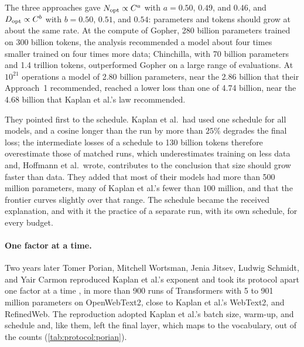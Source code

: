 \begin{refsection}
\begin{finding}\label{fd:protocol:hoffmann}
The three approaches gave $N_{\mathrm{opt}}\propto C^{a}$ with $a=0.50$, $0.49$, and $0.46$, and $D_{\mathrm{opt}}\propto C^{b}$ with $b=0.50$, $0.51$, and $0.54$: parameters and tokens should grow at about the same rate. At the compute of Gopher, 280 billion parameters trained on 300 billion tokens, the analysis recommended a model about four times smaller trained on four times more data; Chinchilla, with 70 billion parameters and 1.4 trillion tokens, outperformed Gopher on a large range of evaluations. At $10^{21}$ operations a model of 2.80 billion parameters, near the 2.86 billion that their Approach~1 recommended, reached a lower loss than one of 4.74 billion, near the 4.68 billion that Kaplan et al.'s law recommended.
\end{finding}

They pointed first to the schedule. Kaplan et al.\ had used one schedule for all models, and a cosine longer than the run by more than $25\%$ degrades the final loss; the intermediate losses of a schedule to 130 billion tokens therefore overestimate those of matched runs, which underestimates training on less data and, Hoffmann et al.\ wrote, contributes to the conclusion that size should grow faster than data. They added that most of their models had more than 500 million parameters, many of Kaplan et al.'s fewer than 100 million, and that the frontier curves slightly over that range. The schedule became the received explanation, and with it the practice of a separate run, with its own schedule, for every budget.

\paragraph{One factor at a time.} Two years later Tomer Porian, Mitchell Wortsman, Jenia Jitsev, Ludwig Schmidt, and Yair Carmon reproduced Kaplan et al.'s exponent and took its protocol apart one factor at a time \parencite{PorianEtAl2024}, in more than 900 runs of Transformers with 5 to 901 million parameters on OpenWebText2, close to Kaplan et al.'s WebText2, and RefinedWeb. The reproduction adopted Kaplan et al.'s batch size, warm-up, and schedule and, like them, left the final layer, which maps to the vocabulary, out of the counts (\cref{tab:protocol:porian}).


\end{refsection}
